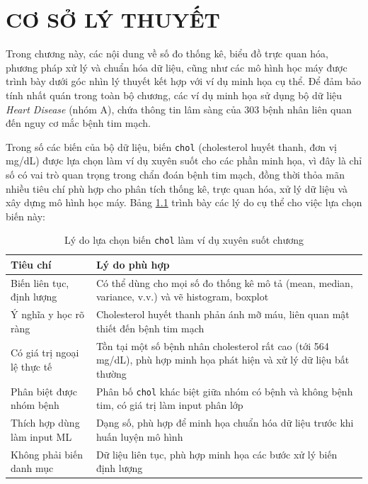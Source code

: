 ﻿\chapter{CƠ SỞ LÝ THUYẾT}

\startcontents[chapters]

Trong chương này, các nội dung về số đo thống kê, biểu đồ trực quan hóa, phương pháp xử lý và chuẩn hóa dữ liệu, cũng như các mô hình học máy được trình bày dưới góc nhìn lý thuyết kết hợp với ví dụ minh họa cụ thể. Để đảm bảo tính nhất quán trong toàn bộ chương, các ví dụ minh họa sử dụng bộ dữ liệu \textit{Heart Disease} (nhóm A), chứa thông tin lâm sàng của 303 bệnh nhân liên quan đến nguy cơ mắc bệnh tim mạch.

Trong số các biến của bộ dữ liệu, biến \texttt{chol} (cholesterol huyết thanh, đơn vị mg/dL) được lựa chọn làm ví dụ xuyên suốt cho các phần minh họa, vì đây là chỉ số có vai trò quan trọng trong chẩn đoán bệnh tim mạch, đồng thời thỏa mãn nhiều tiêu chí phù hợp cho phân tích thống kê, trực quan hóa, xử lý dữ liệu và xây dựng mô hình học máy. Bảng \ref{tab:chapter1_chol_reason} trình bày các lý do cụ thể cho việc lựa chọn biến này:

\begin{table}[H]
\centering
\caption{Lý do lựa chọn biến \texttt{chol} làm ví dụ xuyên suốt chương}
\label{tab:chapter1_chol_reason}
\small
\begin{tabular}{p{}p{}}
\toprule
Tiêu chí & Lý do phù hợp \\
\midrule
Biến liên tục, định lượng & Có thể dùng cho mọi số đo thống kê mô tả (mean, median, variance, v.v.) và vẽ histogram, boxplot \\
Ý nghĩa y học rõ ràng & Cholesterol huyết thanh phản ánh mỡ máu, liên quan mật thiết đến bệnh tim mạch \\
Có giá trị ngoại lệ thực tế & Tồn tại một số bệnh nhân cholesterol rất cao (tới 564 mg/dL), phù hợp minh họa phát hiện và xử lý dữ liệu bất thường \\
Phân biệt được nhóm bệnh & Phân bố \texttt{chol} khác biệt giữa nhóm có bệnh và không bệnh tim, có giá trị làm input phân lớp \\
Thích hợp dùng làm input ML & Dạng số, phù hợp để minh họa chuẩn hóa dữ liệu trước khi huấn luyện mô hình \\
Không phải biến danh mục & Dữ liệu liên tục, phù hợp minh họa các bước xử lý biến định lượng \\
\bottomrule
\end{tabular}
\end{table}

